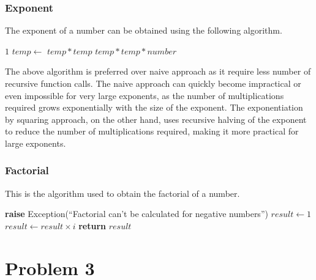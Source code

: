 \documentclass{report}
\begin{document}
\subsection{Exponent}
\begin{flushleft}
The exponent of a number can be obtained using the following algorithm.
\end{flushleft}
\begin{algorithmic}[1]
        \State \Return $1$
    \EndIf
    \State $temp \gets$ 
        \State \Return $temp * temp$
    \Else
        \State \Return $temp * temp * number$
    \EndIf
\EndFunction
\end{algorithmic}
\vspace{2cm}
\begin{flushleft}
  The above algorithm is preferred over naive approach as it require less number of recursive function calls.
  The naive approach can quickly become impractical or even impossible for very large exponents, as the number of multiplications required grows exponentially with the size of the exponent. The exponentiation by squaring approach, on the other hand, uses recursive halving of the exponent to reduce the number of multiplications required, making it more practical for large exponents.
\end{flushleft}

\subsection{Factorial}
\begin{flushleft}
This is the algorithm used to obtain the factorial of a number.
\end{flushleft}
\begin{algorithmic}[1]
    \State \textbf{raise} Exception(``Factorial can't be calculated for negative numbers'')
  \EndIf
  \State $result \gets 1$
    \State $result \gets result \times i$
  \EndFor
  \State \textbf{return} $result$
\EndFunction
\end{algorithmic}

\chapter{Problem 3}



\printindex
\end{document}
